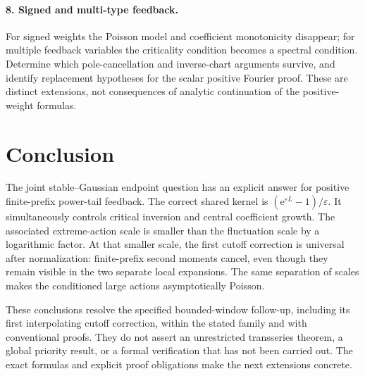 \documentclass[11pt,a4paper]{article}
\numberwithin{equation}{section}
\theoremstyle{definition}
\theoremstyle{remark}
\newcommand{\eps}{\varepsilon}
\newcommand{\ee}{\mathrm e}
\begin{document}
\paragraph{8. Signed and multi-type feedback.}
For signed weights the Poisson model and coefficient monotonicity disappear;
for multiple feedback variables the criticality condition becomes a spectral
condition. Determine which pole-cancellation and inverse-chart arguments
survive, and identify replacement hypotheses for the scalar positive Fourier
proof. These are distinct extensions, not consequences of analytic
continuation of the positive-weight formulas.

\section{Conclusion}
The joint stable--Gaussian endpoint question has an explicit answer for
positive finite-prefix power-tail feedback. The correct shared kernel is
\((\ee^{\eps L}-1)/\eps\). It simultaneously controls critical inversion and
central coefficient growth. The associated extreme-action scale is smaller
than the fluctuation scale by a logarithmic factor. At that smaller scale,
the first cutoff correction is universal after normalization: finite-prefix
second moments cancel, even though they remain visible in the two separate
local expansions. The same separation of scales makes the conditioned large
actions asymptotically Poisson.

These conclusions resolve the specified bounded-window follow-up, including
its first interpolating cutoff correction, within the stated family and with
conventional proofs. They do not assert an unrestricted transseries theorem,
a global priority result, or a formal verification that has not been carried
out. The exact formulas and explicit proof obligations make the next
extensions concrete.

\appendix
\end{document}
